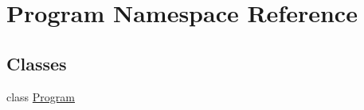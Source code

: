 \hypertarget{namespace_program}{}\section{Program Namespace Reference}
\label{namespace_program}
\subsection*{Classes}
\begin{DoxyCompactItemize}
\item 
class \mbox{\hyperlink{class_program_1_1_program}{Program}}
\end{DoxyCompactItemize}
